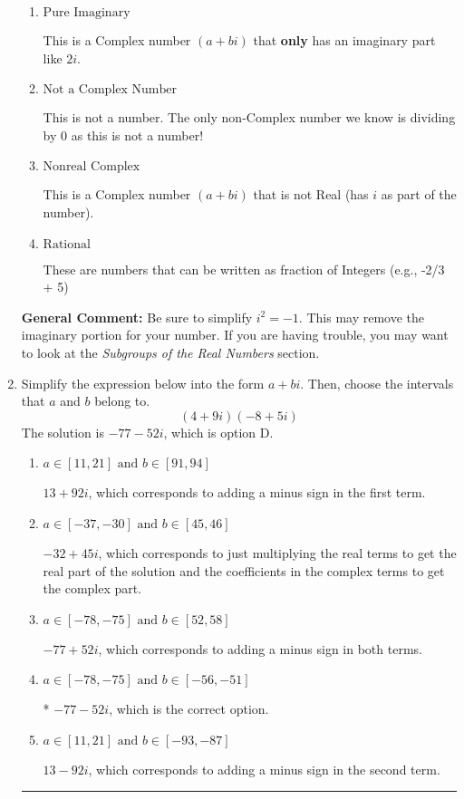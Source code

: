 \documentclass{extbook}[14pt]
\newcommand{\litem}[1]{\item #1

\rule{\textwidth}{0.4pt}}
\begin{document}
\begin{enumerate}
{\begin{enumerate}[label=\Alph*.]
* This is the correct option!
\item \( \text{Pure Imaginary} \)

This is a Complex number $(a+bi)$ that \textbf{only} has an imaginary part like $2i$.
\item \( \text{Not a Complex Number} \)

This is not a number. The only non-Complex number we know is dividing by 0 as this is not a number!
\item \( \text{Nonreal Complex} \)

This is a Complex number $(a+bi)$ that is not Real (has $i$ as part of the number).
\item \( \text{Rational} \)

These are numbers that can be written as fraction of Integers (e.g., -2/3 + 5)
\end{enumerate}

\textbf{General Comment:} Be sure to simplify $i^2 = -1$. This may remove the imaginary portion for your number. If you are having trouble, you may want to look at the \textit{Subgroups of the Real Numbers} section.
}
\litem{
Simplify the expression below into the form $a+bi$. Then, choose the intervals that $a$ and $b$ belong to.
\[ (4 + 9 i)(-8 + 5 i) \]The solution is \( -77 - 52 i \), which is option D.\begin{enumerate}[label=\Alph*.]
\item \( a \in [11, 21] \text{ and } b \in [91, 94] \)

 $13 + 92 i$, which corresponds to adding a minus sign in the first term.
\item \( a \in [-37, -30] \text{ and } b \in [45, 46] \)

 $-32 + 45 i$, which corresponds to just multiplying the real terms to get the real part of the solution and the coefficients in the complex terms to get the complex part.
\item \( a \in [-78, -75] \text{ and } b \in [52, 58] \)

 $-77 + 52 i$, which corresponds to adding a minus sign in both terms.
\item \( a \in [-78, -75] \text{ and } b \in [-56, -51] \)

* $-77 - 52 i$, which is the correct option.
\item \( a \in [11, 21] \text{ and } b \in [-93, -87] \)

 $13 - 92 i$, which corresponds to adding a minus sign in the second term.
\end{enumerate}

}
\end{enumerate}
\end{document}
